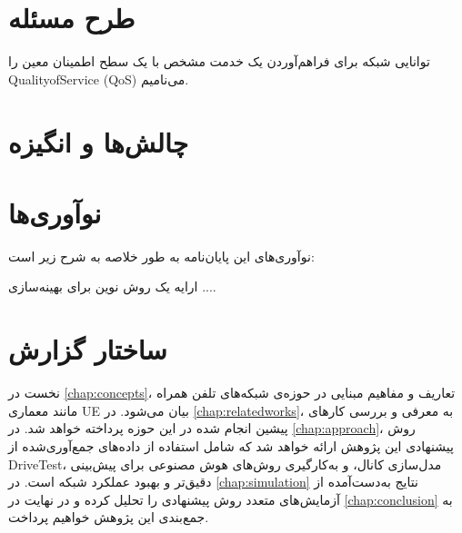 \section{طرح مسئله}

\begin{ntdefinition}[\lr{QoS}]
	توانایی شبکه برای فراهم‌آوردن یک خدمت مشخص با یک سطح اطمینان معین را
 \gls*{QualityofService} (\gls*{QoS})
	می‌نامیم.
\end{ntdefinition}

\section{چالش‌ها و انگیزه}

\section{نوآوری‌ها}
نوآوری‌های این پایان‌نامه به طور خلاصه به شرح زیر است:
 \begin{itemize} 
 \tick 
ارایه یک روش نوین برای بهینه‌سازی ....
 \end{itemize}
 

\section{ساختار گزارش}
نخست در
\autoref{chap:concepts}،
تعاریف و مفاهیم مبنایی در حوزه‌ی شبکه‌های تلفن همراه مانند معماری 
\gls{UE}
بیان می‌شود. در
\autoref{chap:relatedworks}،
به معرفی و بررسی کارهای پیشین انجام شده در این حوزه پرداخته خواهد شد. در 
\autoref{chap:approach}،
روش پیشنهادی این پژوهش ارائه خواهد شد که شامل استفاده از داده‌های جمع‌آوری‌شده از \gls{DriveTest}، مدل‌سازی کانال، و به‌کارگیری روش‌های هوش مصنوعی برای پیش‌بینی دقیق‌تر و بهبود عملکرد شبکه است. در 
\autoref{chap:simulation}
نتایج به‌دست‌آمده از آزمایش‌های متعدد روش پیشنهادی را تحلیل کرده و در نهایت در
\autoref{chap:conclusion}
به جمع‌بندی این پژوهش خواهیم پرداخت.
